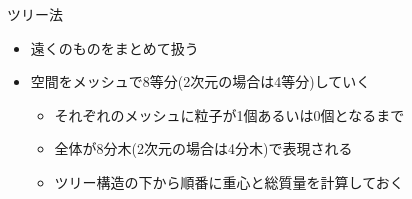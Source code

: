 
\begin{frame}[t,fragile]{ツリー法}
  \begin{itemize}
  \item 遠くのものをまとめて扱う
  \item 空間をメッシュで8等分(2次元の場合は4等分)していく
    \begin{center}
    \end{center}
    \begin{itemize}
    \item それぞれのメッシュに粒子が1個あるいは0個となるまで
    \item 全体が8分木(2次元の場合は4分木)で表現される
    \item ツリー構造の下から順番に重心と総質量を計算しておく
    \end{itemize}
  \end{itemize}
\end{frame}

